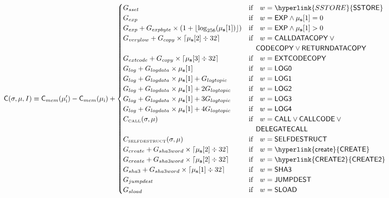 \begin{equation}\label{eq:gas_cost}
\cost(\st, \mst, I) \equiv \cost_{mem}(\mst'_{\mathrm{i}})-\cost_{mem}(\mst_{\mathrm{i}}) + \begin{cases}
G_{sset} & \text{if} \quad w = \hyperlink{SSTORE}{\op{SSTORE}} \\
G_{exp} & \text{if} \quad w = \op{EXP} \wedge \mst_{\mathbf{s}}[1] = 0 \\
G_{exp} + G_{expbyte}\times(1+\lfloor\log_{256}(\mst_{\mathbf{s}}[1])\rfloor) & \text{if} \quad w = \op{EXP} \wedge \mst_{\mathbf{s}}[1] > 0 \\
G_{verylow} + G_{copy}\times\lceil\mst_{\mathbf{s}}[2] \div 32\rceil & \text{if} \quad w = \op{CALLDATACOPY} \> \lor \\
&\quad \op{CODECOPY} \lor \op{RETURNDATACOPY} \\
G_{extcode} + G_{copy}\times\lceil\mst_{\mathbf{s}}[3] \div 32\rceil & \text{if} \quad w = \op{EXTCODECOPY} \\
G_{log}+G_{logdata}\times\mst_{\mathbf{s}}[1] & \text{if} \quad w = \op{LOG0} \\
G_{log}+G_{logdata}\times\mst_{\mathbf{s}}[1]+G_{logtopic} & \text{if} \quad w = \op{LOG1} \\
G_{log}+G_{logdata}\times\mst_{\mathbf{s}}[1]+2G_{logtopic} & \text{if} \quad w = \op{LOG2} \\
G_{log}+G_{logdata}\times\mst_{\mathbf{s}}[1]+3G_{logtopic} & \text{if} \quad w = \op{LOG3} \\
G_{log}+G_{logdata}\times\mst_{\mathbf{s}}[1]+4G_{logtopic} & \text{if} \quad w = \op{LOG4} \\
C_\text{\tiny CALL}(\st, \mst) & \text{if} \quad w = \op{CALL} \lor \op{CALLCODE} \> \lor \\
&\quad\op{DELEGATECALL} \\
C_\text{\tiny SELFDESTRUCT}(\st, \mst) & \text{if} \quad w = \op{SELFDESTRUCT} \\
G_{create}+G_{sha3word} \times \lceil \mst_{\mathbf{s}}[2] \div 32 \rceil & \text{if} \quad w = \op{\hyperlink{create}{CREATE}}\\
G_{create}+G_{sha3word} \times \lceil \mst_{\mathbf{s}}[2] \div 32 \rceil & \text{if} \quad w = \op{\hyperlink{CREATE2}{CREATE2}}\\
G_{sha3}+G_{sha3word} \times \lceil \mst_{\mathbf{s}}[1] \div 32 \rceil & \text{if} \quad w = \op{SHA3}\\
G_{jumpdest} & \text{if} \quad w = \op{JUMPDEST}\\
G_{sload} & \text{if} \quad w = \op{SLOAD}\\

\end{cases}
\end{equation}
